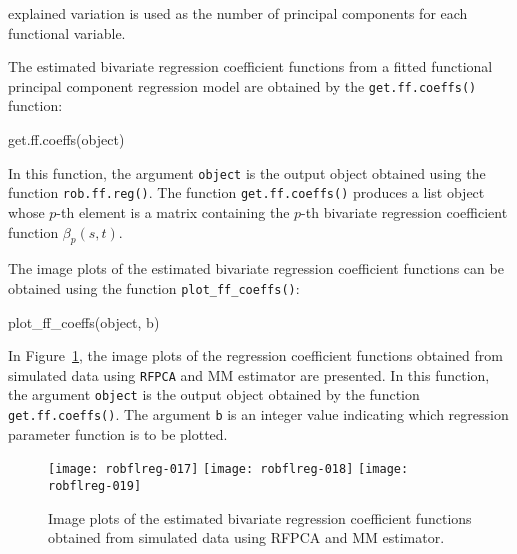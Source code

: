 explained variation is used as the number of principal components for each functional variable.

The estimated bivariate regression coefficient functions from a fitted functional principal component regression model are obtained by the \texttt{get.ff.coeffs()} function:
\begin{smallexample}
\begin{smallverbatim}
get.ff.coeffs(object)
\end{smallverbatim}
\end{smallexample}
In this function, the argument \texttt{object} is the output object obtained using the function \texttt{rob.ff.reg()}. The function \texttt{get.ff.coeffs()} produces a list object whose $p$-th element is a matrix containing the $p$-th bivariate regression coefficient function $\beta_p(s,t)$.

The image plots of the estimated bivariate regression coefficient functions can be obtained using the function \texttt{plot\_ff\_coeffs()}:
\begin{smallexample}
\begin{smallverbatim}
plot_ff_coeffs(object, b)
\end{smallverbatim}
\end{smallexample}
In Figure~\ref{fig:5}, the image plots of the regression coefficient functions obtained from simulated data using \texttt{RFPCA} and MM estimator are presented. In this function, the argument \texttt{object} is the output object obtained by the function \texttt{get.ff.coeffs()}. The argument \texttt{b} is an integer value indicating which regression parameter function is to be plotted.
\begin{figure}[!htb]
  \begin{center}
\texttt{[image: robflreg-017]}
\texttt{[image: robflreg-018]}
\texttt{[image: robflreg-019]}
\end{center}
\caption{Image plots of the estimated bivariate regression coefficient functions obtained from simulated data using RFPCA and MM estimator.}\label{fig:5}
\end{figure}

